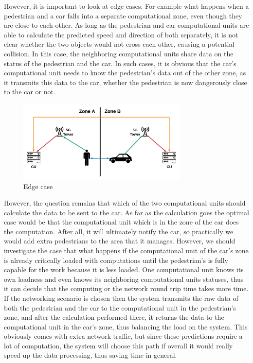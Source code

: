\documentclass[conference]{IEEEtran}
\begin{document}
However, it is important to look at edge cases. For example what happens when a pedestrian and a car falls into a separate computational zone, even though they are close to each other. As long as the pedestrian and car computational units are able to calculate the predicted speed and direction of both separately, it is not clear whether the two objects would not cross each other, causing a potential collision. In this case, the neighboring computational units share data on the status of the pedestrian and the car. In such cases, it is obvious that the car’s computational unit needs to know the pedestrian’s data out of the other zone, as it transmits this data to the car, whether the pedestrian is now dangerously close to the car or not.

\begin{figure}[ht]
    \centering
    \includegraphics[width=8.5cm]{./pics/Edge case.png}
    \caption{Edge case}
\end{figure}

However, the question remains that which of the two computational units should calculate the data to be sent to the car. As far as the calculation goes the optimal case would be that the computational unit which is in the zone of the car does the computation. After all, it will ultimately notify the car, so practically we would add extra pedestrians to the area that it manages. However, we should investigate the case that what happens if the computational unit of the car’s zone is already critically loaded with computations until the pedestrian's is fully capable for the work because it is less loaded. One computational unit knows its own loadness and even knows its neighboring computational units statuses, thus it can decide that the computing or the network round trip time takes more time. If the networking scenario is chosen then the system transmits the raw data of both the pedestrian and the car to the computational unit in the pedestrian's zone, and after the calculation performed there, it returns the data to the computational unit in the car’s zone, thus balancing the load on the system. This obviously comes with extra network traffic, but since these predictions require a lot of computation, the system will choose this path if overall it would really speed up the data processing, thus saving time in general.
\end{document}
